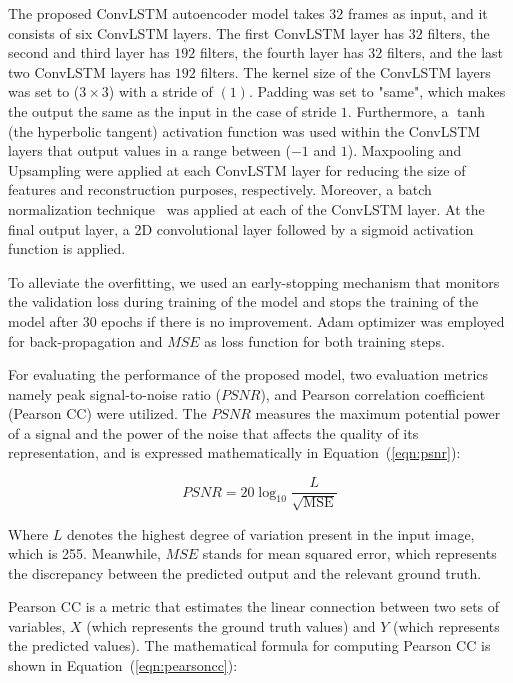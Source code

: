 The proposed ConvLSTM autoencoder model takes \(32\) frames as input, and it 
consists of six ConvLSTM layers.
The first ConvLSTM layer has \(32\) filters, the second and third layer has 
\(192\) filters, the fourth layer has \(32\) filters, and the last two ConvLSTM 
layers has \(192\) filters.
The kernel size of the ConvLSTM layers was set to (\(3\times3\)) with a stride 
of \((1)\). 
Padding was set to "same", which makes the output the same as the input in the 
case of stride \(1\).
Furthermore, a \(\tanh\) (the hyperbolic tangent) activation function was used 
within the ConvLSTM layers that output values in a range between (\(-1\) and 
\(1\)).
Maxpooling and Upsampling were applied at each ConvLSTM layer for reducing the 
size of features and reconstruction purposes, respectively. 
Moreover, a batch normalization technique~\cite{Santurkar2018} was applied 
at each of the ConvLSTM layer.
At the final output layer, a 2D convolutional layer followed by a sigmoid 
activation function is applied.

To alleviate the overfitting, we used an early-stopping mechanism that 
monitors the validation loss during training of the model and stops the 
training of the model after 30 epochs if there is no improvement. 
Adam optimizer was employed for back-propagation and \(MSE\) as loss 
function for both training steps.

For evaluating the performance of the proposed model, two evaluation metrics 
namely peak signal-to-noise ratio (\(PSNR\)), and Pearson correlation 
coefficient (Pearson CC) were utilized. 
The \(PSNR\) measures the maximum potential power of a signal and the power of 
the noise that affects the quality of its representation, and is expressed 
mathematically in Equation~(\ref{eqn:psnr}):

\begin{equation}
	PSNR=20 \log _{10} \frac{L}{\sqrt{\mathrm{MSE}}}
	\label{eqn:psnr}
\end{equation}

Where \(L\) denotes the highest degree of variation present in the input image, 
which is 255. Meanwhile, \(MSE\) stands for mean squared error, which 
represents the discrepancy between the predicted output and the relevant ground 
truth.

Pearson CC is a metric that estimates the linear connection between two sets of 
variables, \(X\) (which represents the ground truth values) and \(Y\) (which 
represents the predicted values). The mathematical formula for computing 
Pearson CC is shown in Equation~(\ref{eqn:pearsoncc}):

